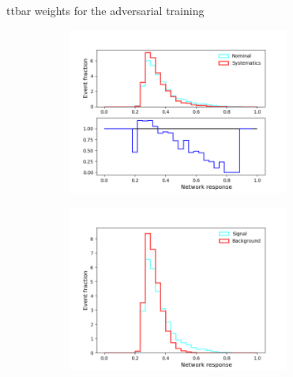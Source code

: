 \documentclass[10pt, UKenglish]{beamer}
\begin{document}
\begin{frame}{ttbar weights for the adversarial training}
\begin{figure}[htbp]
\begin{subfigure}[b]{0.47\textwidth}
        \includegraphics[width=0.8\textwidth]{separation_adversaryweight1.png}
        \label{fig:simple:final:sepa}
    \end{subfigure}
\quad
    \begin{subfigure}[b]{0.47\textwidth}
        \includegraphics[width=0.8\textwidth]{separation_discriminatorweight1.png}
        \label{fig:simple:final:syst}
    \end{subfigure}
    \end{figure}
\end{frame}
\end{document}
